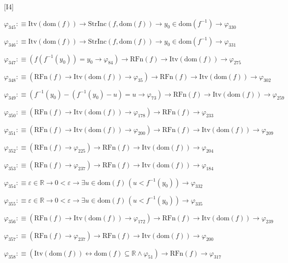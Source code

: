 \begin{fullproof}{[I4]}
\begin{abbrevlist}
\item $\varphi_{345} :\equiv \mathrm{Itv}(\mathrm{dom}(f)) \to \mathrm{StrInc}(f,\mathrm{dom}(f)) \to y_{0} \in \mathrm{dom}(f^{-1}) \to \varphi_{330}$
\item $\varphi_{346} :\equiv \mathrm{Itv}(\mathrm{dom}(f)) \to \mathrm{StrInc}(f,\mathrm{dom}(f)) \to y_{0} \in \mathrm{dom}(f^{-1}) \to \varphi_{331}$
\item $\varphi_{347} :\equiv (f(f^{-1}(y_{0})) = y_{0} \to \varphi_{84}) \to \mathrm{RFn}(f) \to \mathrm{Itv}(\mathrm{dom}(f)) \to \varphi_{275}$
\item $\varphi_{348} :\equiv (\mathrm{RFn}(f) \to \mathrm{Itv}(\mathrm{dom}(f)) \to \varphi_{35}) \to \mathrm{RFn}(f) \to \mathrm{Itv}(\mathrm{dom}(f)) \to \varphi_{302}$
\item $\varphi_{349} :\equiv (f^{-1}(y_{0}) - (f^{-1}(y_{0}) - u) = u \to \varphi_{73}) \to \mathrm{RFn}(f) \to \mathrm{Itv}(\mathrm{dom}(f)) \to \varphi_{259}$
\item $\varphi_{350} :\equiv (\mathrm{RFn}(f) \to \mathrm{Itv}(\mathrm{dom}(f)) \to \varphi_{178}) \to \mathrm{RFn}(f) \to \varphi_{233}$
\item $\varphi_{351} :\equiv (\mathrm{RFn}(f) \to \mathrm{Itv}(\mathrm{dom}(f)) \to \varphi_{200}) \to \mathrm{RFn}(f) \to \mathrm{Itv}(\mathrm{dom}(f)) \to \varphi_{209}$
\item $\varphi_{352} :\equiv (\mathrm{RFn}(f) \to \varphi_{225}) \to \mathrm{RFn}(f) \to \mathrm{Itv}(\mathrm{dom}(f)) \to \varphi_{204}$
\item $\varphi_{353} :\equiv (\mathrm{RFn}(f) \to \varphi_{237}) \to \mathrm{RFn}(f) \to \mathrm{Itv}(\mathrm{dom}(f)) \to \varphi_{184}$
\item $\varphi_{354} :\equiv \varepsilon \in \mathbb{R} \to 0 < \varepsilon \to \exists u \in \mathrm{dom}(f)\,(u < f^{-1}(y_{0})) \to \varphi_{332}$
\item $\varphi_{355} :\equiv \varepsilon \in \mathbb{R} \to 0 < \varepsilon \to \exists u \in \mathrm{dom}(f)\,(u < f^{-1}(y_{0})) \to \varphi_{335}$
\item $\varphi_{356} :\equiv (\mathrm{RFn}(f) \to \mathrm{Itv}(\mathrm{dom}(f)) \to \varphi_{172}) \to \mathrm{RFn}(f) \to \mathrm{Itv}(\mathrm{dom}(f)) \to \varphi_{239}$
\item $\varphi_{357} :\equiv (\mathrm{RFn}(f) \to \varphi_{237}) \to \mathrm{RFn}(f) \to \mathrm{Itv}(\mathrm{dom}(f)) \to \varphi_{200}$
\item $\varphi_{358} :\equiv (\mathrm{Itv}(\mathrm{dom}(f)) \leftrightarrow \mathrm{dom}(f) \subseteq \mathbb{R} \land \varphi_{51}) \to \mathrm{RFn}(f) \to \varphi_{317}$

\end{abbrevlist}
\end{fullproof}
